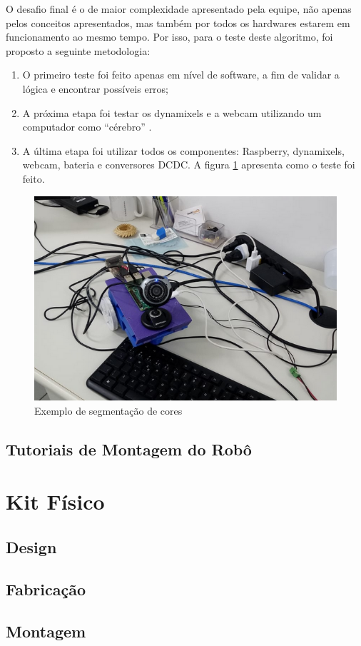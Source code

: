 O desafio final é o de maior complexidade apresentado pela equipe, não apenas pelos conceitos apresentados, mas também por todos os hardwares estarem em funcionamento ao mesmo tempo. Por isso, para o teste deste algoritmo, foi proposto a seguinte metodologia:

\begin{enumerate}
	\item O primeiro teste foi feito apenas em nível de software, a fim de validar a lógica e encontrar possíveis erros;
	\item A próxima etapa foi testar os dynamixels e a webcam utilizando um computador como “cérebro” .
	\item A última etapa foi utilizar todos os componentes: Raspberry, dynamixels, webcam, bateria e conversores DCDC. A figura \ref{fig:testefinal} apresenta como o teste foi feito.
\end{enumerate}
 
 \begin{figure}[H]
 	\centering
 	\includegraphics[scale=0.75, angle=0]{Figures/testefinal.png}
 	\caption{Exemplo de segmentação de cores}
 	\label{fig:testefinal}
 \end{figure}

\subsection{Tutoriais de Montagem do Robô}

\section{Kit Físico}

\subsection{Design}

\subsection{Fabricação}

\subsection{Montagem}
 



